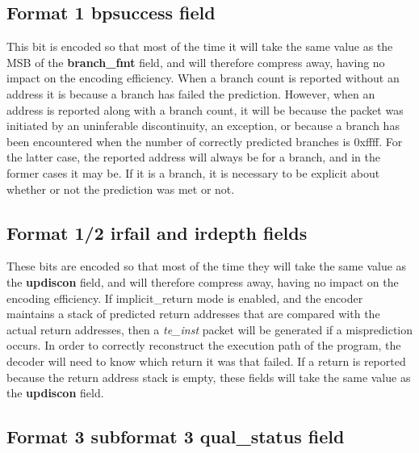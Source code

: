 \subsection{Format 1 \textbf{bpsuccess} field}
This bit is encoded so that most of the time it will take the same value as the MSB of the \textbf{branch\_fmt} field,
and will therefore compress away, having no impact on the encoding efficiency.  When a branch count is reported without 
an address it is because a branch has failed the prediction.  However, when an address is reported along with
a branch count, it will be because the packet was initiated by an uninferable discontinuity, an exception, or because a
branch has been encountered when the number of correctly predicted branches is 0xffff.  For the latter case, the 
reported address will always be for a branch, and in the former cases it may be.  If it is a branch, it is necessary to 
be explicit about whether or not the prediction was met or not.

\subsection{Format 1/2 \textbf{irfail} and \textbf{irdepth} fields} \label{sec:irxx}
These bits are encoded so that most of the time they will take the same value as the \textbf{updiscon} field,
and will therefore compress away, having no impact on the encoding efficiency.  If implicit\_return mode is enabled, and
the encoder maintains a stack of predicted return addresses that are compared with the actual return addresses, then
a \textit{te\_inst} packet will be generated if a misprediction occurs.  In order to correctly reconstruct the 
execution path of the program, the decoder will need to know which return it was that failed.  If a return is reported
because the return address stack is empty, these fields will take the same value as the \textbf{updiscon} field.

\subsection{Format 3 subformat 3 \textbf{qual\_status} field}

